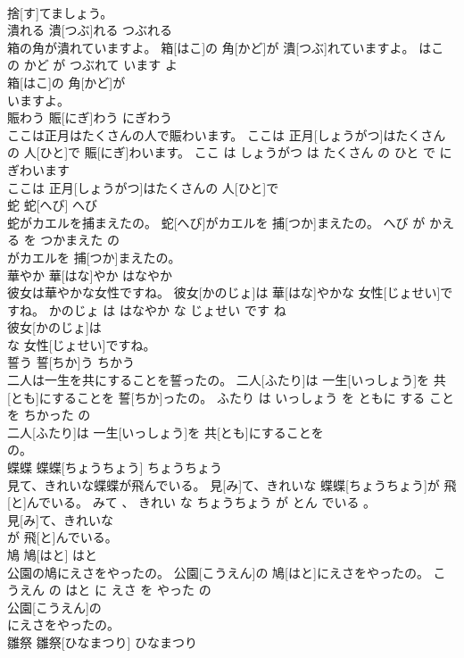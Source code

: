 \documentclass[8pt]{extreport}
\begin{document}
\begin{CJK}{UTF8}{min}
\\	捨[す]てましょう。			
\\	潰れる	潰[つぶ]れる	つぶれる	
\\	箱の角が潰れていますよ。	箱[はこ]の 角[かど]が 潰[つぶ]れていますよ。	はこ の かど が つぶれて います よ	
\\	箱[はこ]の 角[かど]が
\\	いますよ。			
\\	賑わう	賑[にぎ]わう	にぎわう	
\\	ここは正月はたくさんの人で賑わいます。	ここは 正月[しょうがつ]はたくさんの 人[ひと]で 賑[にぎ]わいます。	ここ は しょうがつ は たくさん の ひと で にぎわいます	
\\	ここは 正月[しょうがつ]はたくさんの 人[ひと]で
\\	蛇	蛇[へび]	へび	
\\	蛇がカエルを捕まえたの。	蛇[へび]がカエルを 捕[つか]まえたの。	へび が かえる を つかまえた の	
\\	がカエルを 捕[つか]まえたの。			
\\	華やか	華[はな]やか	はなやか	
\\	彼女は華やかな女性ですね。	彼女[かのじょ]は 華[はな]やかな 女性[じょせい]ですね。	かのじょ は はなやか な じょせい です ね	
\\	彼女[かのじょ]は
\\	な 女性[じょせい]ですね。			
\\	誓う	誓[ちか]う	ちかう	
\\	二人は一生を共にすることを誓ったの。	二人[ふたり]は 一生[いっしょう]を 共[とも]にすることを 誓[ちか]ったの。	ふたり は いっしょう を ともに する こと を ちかった の	
\\	二人[ふたり]は 一生[いっしょう]を 共[とも]にすることを
\\	の。			
\\	蝶蝶	蝶蝶[ちょうちょう]	ちょうちょう	
\\	見て、きれいな蝶蝶が飛んでいる。	見[み]て、きれいな 蝶蝶[ちょうちょう]が 飛[と]んでいる。	みて 、 きれい な ちょうちょう が とん でいる 。	
\\	見[み]て、きれいな
\\	が 飛[と]んでいる。			
\\	鳩	鳩[はと]	はと	
\\	公園の鳩にえさをやったの。	公園[こうえん]の 鳩[はと]にえさをやったの。	こうえん の はと に えさ を やった の	
\\	公園[こうえん]の
\\	にえさをやったの。			
\\	雛祭	雛祭[ひなまつり]	ひなまつり	

\end{CJK}
\end{document}
